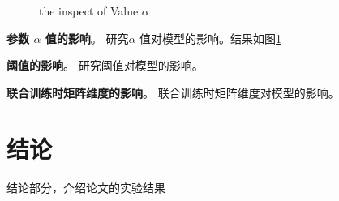 \documentclass[lang=cn,11pt]{elegantpaper}
\begin{document}
\begin{figure}[htbp]
	\centering
	\quad
	\quad
	\quad
	\caption{ the inspect of Value $ \alpha $\label{fig:alpha}} 
\end{figure}




\textbf{参数 $ \alpha $ 值的影响}。 研究$ \alpha $ 值对模型的影响。结果如图\ref{fig:alpha}

\textbf{阈值的影响}。 研究阈值对模型的影响。

\textbf{联合训练时矩阵维度的影响}。 联合训练时矩阵维度对模型的影响。


\section{结论}
结论部分，介绍论文的实验结果




\end{document}
